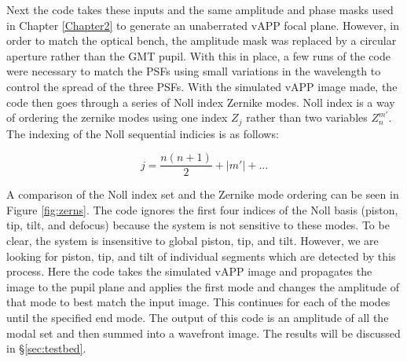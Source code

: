 Next the code takes these inputs and the same amplitude and phase masks used in Chapter \ref{Chapter2} to generate an unaberrated vAPP focal plane.  However, in order to match the optical bench, the amplitude mask was replaced by a circular aperture rather than the GMT pupil.  With this in place, a few runs of the code were necessary to match the PSFs using small variations in the wavelength to control the spread of the three PSFs.  With the simulated vAPP image made, the code then goes through a series of Noll index Zernike modes.  Noll index is a way of ordering the zernike modes using one index $Z_j$ rather than two variables $Z_n^{m'}$\cite{Noll1976ZERNIKETURBULENCE.}.  The indexing of the Noll sequential indicies is as follows:

\begin{equation}
    j = \frac{n(n+1)}{2} + |m'| + ...
    \label{eq:noll}
\end{equation}

A comparison of the Noll index set and the Zernike mode ordering can be seen in Figure \ref{fig:zerns}.  The code ignores the first four indices of the Noll basis (piston, tip, tilt, and defocus)  because the system is not sensitive to these modes.  To be clear, the system is insensitive to global piston, tip, and tilt.  However, we are looking for piston, tip, and tilt of individual segments which are detected by this process.  Here the code takes the simulated vAPP image and propagates the image to the pupil plane and applies the first mode and changes the amplitude of that mode to best match the input image.  This continues for each of the modes until the specified end mode.  The output of this code is an amplitude of all the modal set and then summed into a wavefront image.  The results will be discussed in \S \ref{sec:testbed}.

